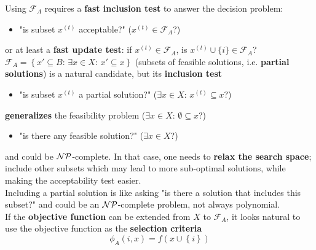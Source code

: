 Using $\mathcal{F}_A$ requires a \textbf{fast inclusion test} to answer the decision problem:
\begin{itemize}[label*=]
	\item "is subset $x^{(t)}$ acceptable?" ($x^{(t)} \in \mathcal{F}_A$?)
\end{itemize}
or at least a \textbf{fast update test}: if $x^{(t)} \in \mathcal{F}_A$, is $x^{(t)} \cup \{i\} \in \mathcal{F}_A$? \\

$\mathcal{F}_A = \left\{x' \subseteq B : \, \exists x \in X : \, x' \subseteq x\right\}$ (subsets of feasible solutions, i.e. \textbf{partial solutions}) is a natural candidate, but its \textbf{inclusion test}
\begin{itemize}[label*=]
	\item "is subset $x^{(t)}$ a partial solution?" ($\exists x \in X : \, x^{(t)} \subseteq x$?)
\end{itemize}
\textbf{generalizes} the feasibility problem ($\exists x \in X : \, \emptyset \subseteq x$?)
\begin{itemize}[label*=]
	\item "is there any feasible solution?" ($\exists x \in X$?)
\end{itemize}
and could be $\mathcal{NP}$-complete. In that case, one needs to \textbf{relax the search space}; include other subsets which may lead to more sub-optimal solutions, while making the acceptability test easier.\\

Including a partial solution is like asking "is there a solution that includes this subset?" and could be an $\mathcal{NP}$-complete problem, not always polynomial.\\

If the \textbf{objective function} can be extended from $X$ to $\mathcal{F}_A$, it looks natural to use the objective function as the \textbf{selection criteria}
$$ \phi_A (i,x) = f \left(x \cup \left\{i\right\} \right)$$

\newpage

